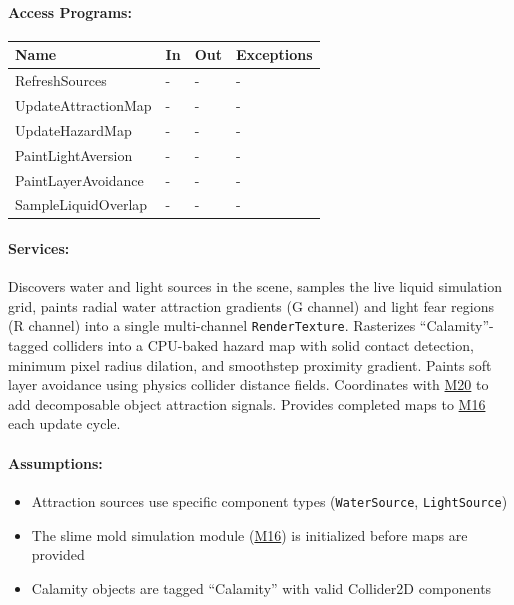 \documentclass[12pt, titlepage]{article}
\begin{document}
\paragraph{Access Programs:}

\begin{center}
\begin{tabular}{p{50mm}p{2.5cm}p{2.5cm}p{22mm}}
\toprule
\textbf{Name} & \textbf{In} & \textbf{Out} & \textbf{Exceptions} \\
\midrule
RefreshSources & - & - & - \\
UpdateAttractionMap & - & - & - \\
UpdateHazardMap & - & - & - \\
PaintLightAversion & - & - & - \\
PaintLayerAvoidance & - & - & - \\
SampleLiquidOverlap & - & - & - \\
\bottomrule
\end{tabular}
\end{center}

\paragraph{Services:}
Discovers water and light sources in the scene, samples the live liquid simulation grid,
paints radial water attraction gradients (G channel) and light fear regions (R channel)
into a single multi-channel \texttt{RenderTexture}. Rasterizes ``Calamity''-tagged colliders
into a CPU-baked hazard map with solid contact detection, minimum pixel radius dilation, and
smoothstep proximity gradient. Paints soft layer avoidance using physics collider distance
fields. Coordinates with \hyperref[M20]{M20} to add decomposable object attraction signals.
Provides completed maps to \hyperref[M16]{M16} each update cycle.

\paragraph{Assumptions:}
\begin{itemize}
\item Attraction sources use specific component types (\texttt{WaterSource}, \texttt{LightSource})
\item The slime mold simulation module (\hyperref[M16]{M16}) is initialized before maps are provided
\item Calamity objects are tagged ``Calamity'' with valid Collider2D components
\end{itemize}
\end{document}
